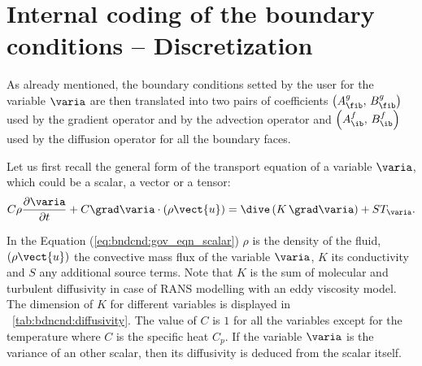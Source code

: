 \section{Internal coding of the boundary conditions -- Discretization}

As already mentioned, the boundary conditions setted by the user for the variable $\varia$
are then translated into two pairs of coefficients $\left( A^g_\fib , \, B^g_\fib\right)$ used by the gradient operator and by the advection operator and $\left( A^f_\ib , \, B^f_\ib\right)$ used by the diffusion operator for all the boundary faces.

Let us first recall the general form of the transport equation of a variable $\varia$, which could be a scalar, 
a vector or a tensor: 
\begin{equation}\label{eq:bndcnd:gov_eqn_scalar}
\displaystyle C \rho \frac{\partial \varia}{\partial t} + C \grad \varia \cdot \left( \rho \vect{u} \right) = \dive \left(\displaystyle K \, \grad \varia \right) +ST_\varia .
\end{equation}

In the Equation (\ref{eq:bndcnd:gov_eqn_scalar})
$\rho$ is the density of the fluid, $\left( \rho \vect{u} \right)$ the convective mass flux of the variable $\varia$, $K$ its
conductivity and $S$ any additional source terms. 
Note that $K$ is the sum of molecular and turbulent diffusivity in case of RANS modelling with an eddy viscosity model. 
The dimension of $K$ for different variables is displayed in \tablename~\ref{tab:bdncnd:diffusivity}.
The value of $C$ is $1$ for all the variables except for the temperature where $C$ is the specific heat $C_p$.
If the variable $\varia$ is the variance of an other scalar, then its diffusivity
is deduced from the scalar itself. 

